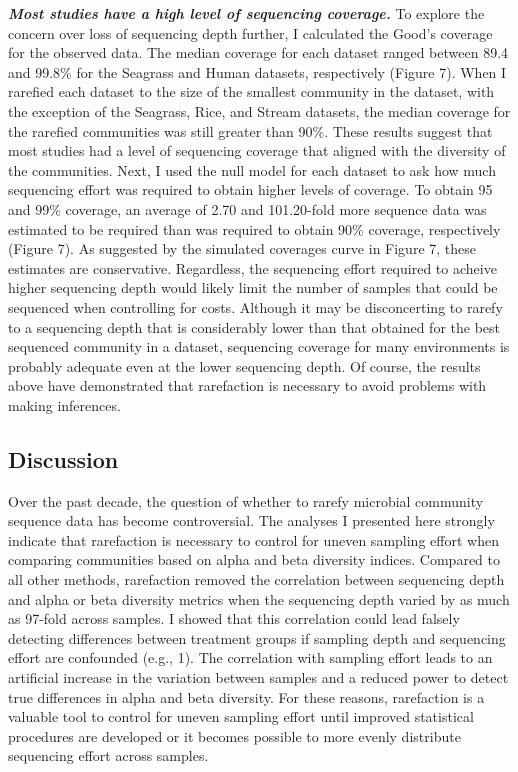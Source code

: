 \documentclass[
]{article}
\begin{document}
\textbf{\emph{Most studies have a high level of sequencing coverage.}}
To explore the concern over loss of sequencing depth further, I
calculated the Good's coverage for the observed data. The median
coverage for each dataset ranged between 89.4 and 99.8\% for the
Seagrass and Human datasets, respectively (Figure 7). When I rarefied
each dataset to the size of the smallest community in the dataset, with
the exception of the Seagrass, Rice, and Stream datasets, the median
coverage for the rarefied communities was still greater than 90\%. These
results suggest that most studies had a level of sequencing coverage
that aligned with the diversity of the communities. Next, I used the
null model for each dataset to ask how much sequencing effort was
required to obtain higher levels of coverage. To obtain 95 and 99\%
coverage, an average of 2.70 and 101.20-fold more sequence data was
estimated to be required than was required to obtain 90\% coverage,
respectively (Figure 7). As suggested by the simulated coverages curve
in Figure 7, these estimates are conservative. Regardless, the
sequencing effort required to acheive higher sequencing depth would
likely limit the number of samples that could be sequenced when
controlling for costs. Although it may be disconcerting to rarefy to a
sequencing depth that is considerably lower than that obtained for the
best sequenced community in a dataset, sequencing coverage for many
environments is probably adequate even at the lower sequencing depth. Of
course, the results above have demonstrated that rarefaction is
necessary to avoid problems with making inferences.

\hypertarget{discussion}{%
\subsection{Discussion}\label{discussion}}

Over the past decade, the question of whether to rarefy microbial
community sequence data has become controversial. The analyses I
presented here strongly indicate that rarefaction is necessary to
control for uneven sampling effort when comparing communities based on
alpha and beta diversity indices. Compared to all other methods,
rarefaction removed the correlation between sequencing depth and alpha
or beta diversity metrics when the sequencing depth varied by as much as
97-fold across samples. I showed that this correlation could lead
falsely detecting differences between treatment groups if sampling depth
and sequencing effort are confounded (e.g., 1). The correlation with
sampling effort leads to an artificial increase in the variation between
samples and a reduced power to detect true differences in alpha and beta
diversity. For these reasons, rarefaction is a valuable tool to control
for uneven sampling effort until improved statistical procedures are
developed or it becomes possible to more evenly distribute sequencing
effort across samples.
\end{document}
